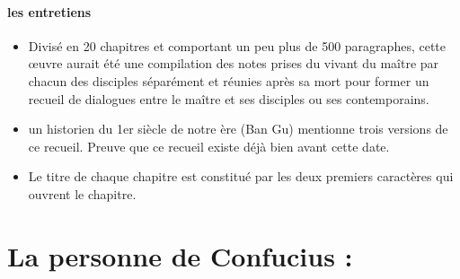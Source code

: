 \paragraph{les entretiens}
\begin{itemize}
    \item  	Divisé en 20 chapitres et comportant un peu plus de 500 paragraphes, cette œuvre aurait été une compilation des notes prises du vivant du maître par chacun des disciples séparément et réunies après sa mort pour former un recueil de dialogues entre le maître et ses disciples ou ses contemporains.
    \item 	un historien du 1er siècle de notre ère (Ban Gu) mentionne trois versions de ce recueil. Preuve que ce recueil existe déjà bien avant cette date.
    \item 	Le titre de chaque chapitre est constitué par les deux premiers caractères qui ouvrent le chapitre.
\end{itemize}



\section{La personne de Confucius : }

